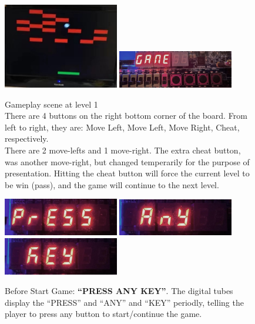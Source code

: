 \documentclass[conference]{IEEEtran}
\begin{document}
\begin{figure}[h] %
    \centering
    \includegraphics[width=0.45\textwidth]{imageset/diag_3}
    \includegraphics[width=0.45\textwidth]{imageset/buttons}    
    \caption{
        Gameplay scene at level 1\\
        There are 4 buttons on the right bottom corner of the board. From left to right, they are: Move Left, Move Left, Move Right, Cheat, respectively. \\
        There are 2 move-lefts and 1 move-right. The extra cheat button, was another move-right, but changed temperarily for the purpose of presentation. Hitting the cheat button will force the current level to be win (pass), and the game will continue to the next level.
    }
    \label{fig_gameplay}
\end{figure}

\begin{figure}[h] %
    \centering
    \includegraphics[width=0.45\textwidth]{imageset/press}
    \includegraphics[width=0.45\textwidth]{imageset/any}
    \includegraphics[width=0.45\textwidth]{imageset/key}
    \caption{Before Start Game: \textbf{``PRESS ANY KEY''}. The digital tubes display the ``PRESS'' and ``ANY'' and ``KEY'' periodly, telling the player to press any button to start/continue the game.}
    \label{fig_idle}
\end{figure}
\end{document}
